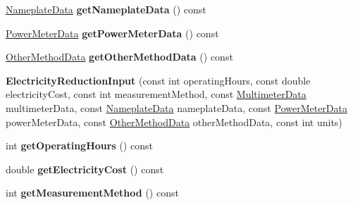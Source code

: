 \begin{DoxyCompactItemize}
\item 
\mbox{\label{class_electricity_reduction_input_a2d63fc41d86ea60fe16389bab1b4ac09}} 
\hyperlink{class_nameplate_data}{Nameplate\+Data} {\bfseries get\+Nameplate\+Data} () const
\item 
\mbox{\label{class_electricity_reduction_input_a4ba54572c92951231af9c506d3f494e7}} 
\hyperlink{class_power_meter_data}{Power\+Meter\+Data} {\bfseries get\+Power\+Meter\+Data} () const
\item 
\mbox{\label{class_electricity_reduction_input_a9963ea6b61ac8bb57026e3e2c7d307ca}} 
\hyperlink{class_other_method_data}{Other\+Method\+Data} {\bfseries get\+Other\+Method\+Data} () const
\item 
\mbox{\label{class_electricity_reduction_input_a4bfb56de8fd6b191370d96c4470960a2}} 
{\bfseries Electricity\+Reduction\+Input} (const int operating\+Hours, const double electricity\+Cost, const int measurement\+Method, const \hyperlink{class_multimeter_data}{Multimeter\+Data} multimeter\+Data, const \hyperlink{class_nameplate_data}{Nameplate\+Data} nameplate\+Data, const \hyperlink{class_power_meter_data}{Power\+Meter\+Data} power\+Meter\+Data, const \hyperlink{class_other_method_data}{Other\+Method\+Data} other\+Method\+Data, const int units)
\item 
\mbox{\label{class_electricity_reduction_input_a585b741c3a3e90278ebc42d123d6edf8}} 
int {\bfseries get\+Operating\+Hours} () const
\item 
\mbox{\label{class_electricity_reduction_input_a0f6334d0398e74c943dc27a7f933d8a1}} 
double {\bfseries get\+Electricity\+Cost} () const
\item 
\mbox{\label{class_electricity_reduction_input_a8a69fb38d3c5e84423298694247d4792}} 
int {\bfseries get\+Measurement\+Method} () const
\item 
\mbox{\label{class_electricity_reduction_input_a146159d4cac2232f7ef29e4b2ac58327}} 

\end{DoxyCompactItemize}
